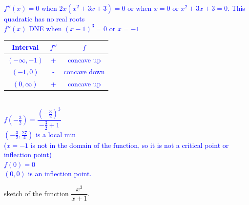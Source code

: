 \documentclass{ximera}
\begin{document}
\begin{exercise}
\begin{enumerate}
    
    \textcolor{blue}{
    $f''(x)=0$ when $2x(x^2+3x+3)=0$ or when $x=0$ or $x^2+3x+3=0$.  This quadratic has no real roots\\
    $f''(x)$ DNE when $(x-1)^3=0$ or $x=-1$\\
    \begin{tabular}{c|c|c}
        Interval &  $f''$ & $f$ \\ \hline
        $(-\infty, -1)$ & + & concave up\\
        $(-1,0)$ & - & concave down\\
        $(0,\infty)$ & + & concave up
    \end{tabular}}
    \\
    \textcolor{blue}{
    $f(-\frac32)=\dfrac{(-\frac32)^3}{-\frac32+1}$\\
    $(-\frac32, \frac{27}{4})$ is a local min\\
    ($x=-1$ is not in the domain of the function, so it is not a critical point or inflection point) \\
    $f(0)=0$\\
    $(0,0)$ is an inflection point.\\}
     \begin{image} 
    \end{image}
        \xmalt sketch of the function $\dfrac{x^3}{x+1 }$.
    
    
\end{enumerate}
\end{exercise}
\end{document}
